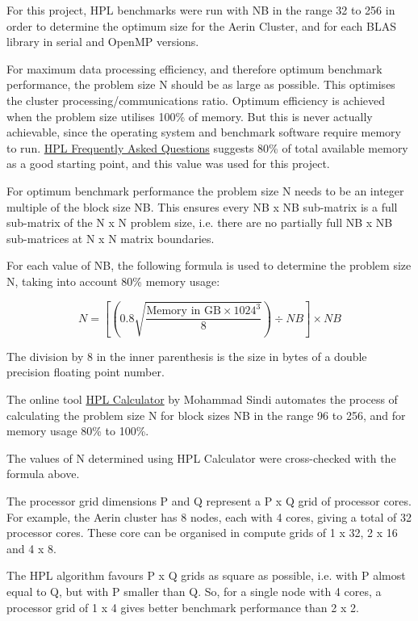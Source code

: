 \documentclass{report}
\begin{document}
For this project, HPL benchmarks were run with NB in the range 32 to 256 in order to determine the optimum size for the Aerin Cluster, and for each BLAS library in serial and OpenMP versions. 

For maximum data processing efficiency, and therefore optimum benchmark performance, the problem size N should be as large as possible. This optimises the cluster processing/communications ratio. Optimum efficiency is achieved when the problem size utilises 100\% of memory. But this is never actually achievable, since the operating system and benchmark software require memory to run. \href{https://www.netlib.org/benchmark/hpl/faqs.html}{HPL Frequently Asked Questions} suggests 80\% of total available memory as a good starting point, and this value was used for this project.

For optimum benchmark performance the problem size N needs to be an integer multiple of the block size NB. This ensures every NB x NB sub-matrix is a full sub-matrix of the N x N problem size, i.e. there are no partially full NB x NB sub-matrices at N x N matrix boundaries.

For each value of NB, the following formula is used to determine the problem size N, taking into account 80\% memory usage:

\[N = \left[\left(0.8 \sqrt{\frac{\text{Memory in GB} \times 1024^3}{8}}\right) \div NB\right] \times NB\]

The division by 8 in the inner parenthesis is the size in bytes of a double precision floating point number.


The online tool \href{http://hpl-calculator.sourceforge.net}{HPL Calculator} by Mohammad Sindi automates the process of calculating the problem size N for block sizes NB in the range 96 to 256, and for memory usage 80\% to 100\%.

The values of N determined using HPL Calculator were cross-checked with the formula above.

The processor grid dimensions P and Q represent a P x Q grid of processor cores. For example, the Aerin cluster has 8 nodes, each with 4 cores, giving a total of 32 processor cores. These core can be organised in compute grids of 1 x 32, 2 x 16 and 4 x 8.

The HPL algorithm favours P x Q grids as square as possible, i.e. with P almost equal to Q, but with P smaller than Q. So, for a single node with 4 cores, a processor grid of 1 x 4 gives better benchmark performance than 2 x 2.
\end{document}
